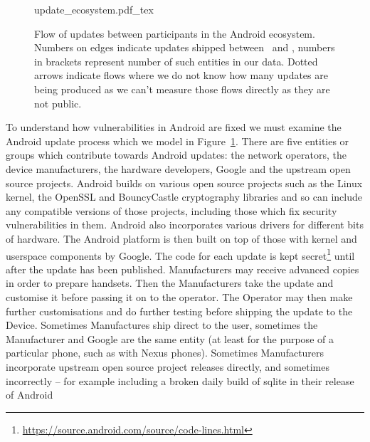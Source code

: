 \documentclass[conference,a4paper,twoside]{IEEEtran}
\let\OldTodo\todo
\renewcommand{\todo}{\OldTodo[inline]}
\newcommand{\todolater}[1]{}%
\begin{document}
\label{sec:android_update_process}
\begin{figure}
 \centering
 \def\svgwidth{\columnwidth}
 {update_ecosystem.pdf_tex}
 \caption{Flow of updates between participants in the Android ecosystem.
 Numbers on edges indicate updates shipped between \daStartDate\ and \daEndDate, numbers in brackets represent number of such entities in our data.
 Dotted arrows indicate flows where we do not know how many updates are being produced as we can't measure those flows directly as they are not public.}
 \label{fig:update_ecosystem}
\end{figure}
To understand how vulnerabilities in Android are fixed we must examine the Android update process which we model in Figure~\ref{fig:update_ecosystem}.
There are five entities or groups which contribute towards Android updates: the network operators, the device manufacturers, the hardware developers, Google and the upstream open source projects.
Android builds on various open source projects such as the Linux kernel, the OpenSSL and BouncyCastle cryptography libraries and so can include any compatible versions of those projects, including those which fix security vulnerabilities in them.
Android also incorporates various drivers for different bits of hardware.
The Android platform is then built on top of those with kernel and userspace components by Google.
The code for each update is kept secret\footnote{\url{https://source.android.com/source/code-lines.html}}\todolater{Can we quantify this keeping the code secret? Is it worth it?} until after the update has been published.
Manufacturers may receive advanced copies in order to prepare handsets.
Then the Manufacturers take the update and customise it before passing it on to the operator.
The Operator may then make further customisations and do further testing before shipping the update to the Device.
Sometimes Manufactures ship direct to the user, sometimes the Manufacturer and Google are the same entity (at least for the purpose of a particular phone, such as with Nexus phones).
Sometimes Manufacturers incorporate upstream open source project releases directly, and sometimes incorrectly -- for example including a broken daily build of sqlite in their release of Android
\todolater{use statistics from samsung-updates.com -> how many binaries are there per device?}
\end{document}
